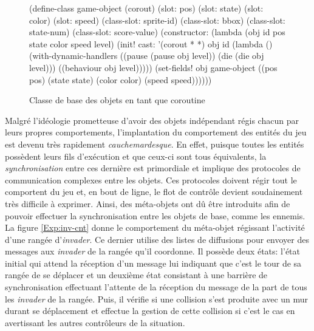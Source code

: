 \documentclass[12pt,twoside,letterpaper,francais]{book}
\newcommand{\scheme}[1]{\selectlanguage{english}{\tt #1}\selectlanguage{french}}
\begin{document}
\begin{figure}[htb!]
  \begin{schemecode}
(define-class game-object (corout)
  (slot: pos)
  (slot: state)
  (slot: color)
  (slot: speed)
  (class-slot: sprite-id)
  (class-slot: bbox)
  (class-slot: state-num)
  (class-slot: score-value)
  (constructor: (lambda (obj id pos state color speed level)
                  (init! cast: '(corout * *) obj id
                         (lambda ()(with-dynamic-handlers
                                    ((pause (pause obj level))
                                     (die   (die   obj level)))
                                    ((behaviour obj level)))))
                  (set-fields! obj game-object
                    ((pos pos)     (state state)
                     (color color) (speed speed))))))
  \end{schemecode}
  \caption{Classe de base des objets en tant que coroutine}
  \label{Exp:si3-class}
\end{figure}

Malgré l'idéologie prometteuse d'avoir des objets indépendant régis
chacun par leurs propres comportements, l'implantation du comportement
des entités du jeu est devenu très rapidement
\emph{cauchemardesque}. En effet, puisque toutes les entités possèdent
leurs fils d'exécution et que ceux-ci sont tous équivalents, la
\emph{synchronisation} entre ces dernière est primordiale et implique
des protocoles de communication complexes entre les objets. Ces
protocoles doivent régir tout le comportent du jeu et, en bout de
ligne, le flot de contrôle devient soudainement très difficile à
exprimer. Ainsi, des méta-objets ont dû être introduits afin de
pouvoir effectuer la synchronisation entre les objets de base, comme
les ennemis. La figure \ref{Exp:inv-cnt} donne le comportement du
méta-objet régissant l'activité d'une rangée d'\textit{invader}. Ce
dernier utilise des listes de diffusions pour envoyer des messages aux
\textit{invader} de la rangée qu'il coordonne. Il possède deux états:
l'état initial qui attend la réception d'un message lui indiquant que
c'est le tour de sa rangée de se déplacer et un deuxième état
consistant à une barrière de synchronisation effectuant l'attente de
la réception du message \scheme{moved} de la part de tous les
\textit{invader} de la rangée. Puis, il vérifie si une collision s'est
produite avec un mur durant se déplacement et effectue la gestion de
cette collision si c'est le cas en avertissant les autres contrôleurs
de la situation.
\end{document}
